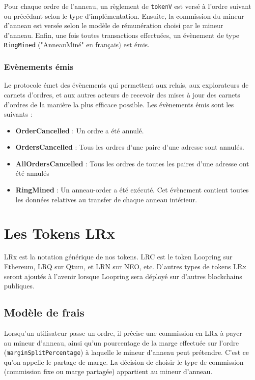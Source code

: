 \documentclass[UTF8,nofonts]{article}
\begin{document}
\begin{multicols}{2}
Pour chaque ordre de l'anneau, un règlement de \verb|tokenV| est versé à l'ordre suivant ou précédant selon le type d'implémentation. Ensuite, la commission du mineur d'anneau est versée selon le modèle de rémunération choisi par le mineur d'anneau. Enfin, une fois toutes transactions effectuées, un évènement de type \verb|RingMined| ("AnneauMiné" en français) est émis.

\subsubsection{Evènements émis\label{sec:events}}

Le protocole émet des évènements qui permettent aux relais, aux explorateurs de carnets d'ordres, et aux autres acteurs de recevoir des mises à jour des carnets d'ordres de la manière la plus efficace possible. Les évènements émis sont les suivants :

\begin{itemize}
	\item \textbf{OrderCancelled} : Un ordre a été annulé.
	\item \textbf{OrdersCancelled} : Tous les ordres d'une paire d'une adresse sont annulés.
	\item \textbf{AllOrdersCancelled} : Tous les ordres de toutes les paires d'une adresse ont été annulés
	\item \textbf{RingMined} : Un anneau-order a été exécuté. Cet évènement contient toutes les données relatives au transfer de chaque anneau intérieur. 
\end{itemize}


\section{Les Tokens LRx \label{sec:token}}
LRx est la notation générique de nos tokens. LRC est le token Loopring sur Ethereum, LRQ sur Qtum, et LRN sur NEO, etc. D'autres types de tokens LRx seront ajoutés à l'avenir lorsque Loopring sera déployé sur d'autres blockchains publiques.

\subsection{Modèle de frais\label{sec:fee_model}} 
Lorsqu'un utilisateur passe un ordre, il précise une commission en LRx à payer au mineur d'anneau, ainsi qu'un pourcentage de la marge effectuée sur l'ordre (\verb|marginSplitPercentage|) à laquelle le mineur d'anneau peut prétendre. C'est ce qu'on appelle le partage de marge. La décision de choisir le type de commission (commission fixe ou marge partagée) appartient au mineur d'anneau.


\end{multicols}
\end{document}
